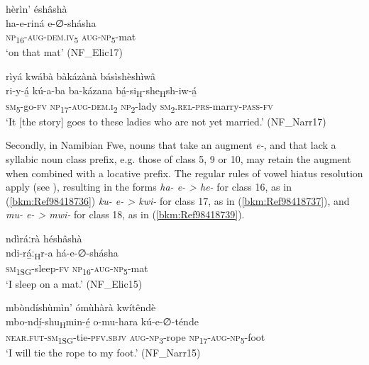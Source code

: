 \ea
\label{bkm:Ref97891916}
hèrìn’ éshâshà\\
\gll ha-e-riná    e-∅-shásha\\
\textsc{np}\textsubscript{16}-\textsc{aug}-\textsc{dem}.\textsc{iv}\textsubscript{5}  \textsc{aug}-\textsc{np}\textsubscript{5}-mat\\
\glt ‘on that mat’ (NF\_Elic17)
\z

\ea
\label{bkm:Ref71011804}
rìyá kwábà bàkázànà básìshèshìwâ\\
\gll ri-y-á̲    kú-a-ba    ba-kázana  bá̲-si\textsubscript{H}-she\textsubscript{H}sh-iw-á̲\\
\textsc{sm}\textsubscript{5}-go-\textsc{fv}  \textsc{np}\textsubscript{17}-\textsc{aug}-\textsc{dem}.\textsc{i}\textsubscript{2}  \textsc{np}\textsubscript{2}-lady  \textsc{sm}\textsubscript{2\-}.\textsc{rel}-\textsc{prs}-marry-\textsc{pass}-\textsc{fv}\\
\glt ‘It [the story] goes to these ladies who are not yet married.’ (NF\_Narr17)
\z

Secondly, in Namibian Fwe, nouns that take an augment \textit{e-}, and that lack a syllabic noun class prefix, e.g. those of class 5, 9 or 10, may retain the augment when combined with a locative prefix. The regular rules of vowel hiatus resolution apply (see ), resulting in the forms \textit{ha- e- > he-} for class 16, as in (\ref{bkm:Ref98418736}) \textit{ku- e- > kwi-} for class 17, as in (\ref{bkm:Ref98418737}), and \textit{mu- e- > mwi-} for class 18, as in (\ref{bkm:Ref98418739}).

\ea
\label{bkm:Ref98418736}
ndìráːrà héshâshà\\
\gll ndi-rá̲ː\textsubscript{H}r-a    há-e-∅-shásha\\
\textsc{sm}\textsubscript{1SG}-sleep-\textsc{fv}  \textsc{np}\textsubscript{16}-\textsc{aug}-\textsc{np}\textsubscript{5}-mat\\
\glt ‘I sleep on a mat.’ (NF\_Elic15)
\z

\ea
\label{bkm:Ref98418737}
mbòndíshùmìn’ ómùhàrà kwítêndè\\
\gll mbo-ndí̲-shu\textsubscript{H}min-é̲    o-mu-hara    kú-e-∅-ténde\\
\textsc{near}.\textsc{fut}-\textsc{sm}\textsubscript{1SG}-tie-\textsc{pfv}.\textsc{sbjv}  \textsc{aug}-\textsc{np}\textsubscript{3}-rope  \textsc{np}\textsubscript{17}-\textsc{aug}-\textsc{np}\textsubscript{5}-foot\\
\glt ‘I will tie the rope to my foot.’ (NF\_Narr15)
\z

